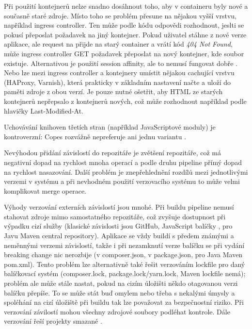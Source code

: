 
        Při použití kontejnerů nelze snadno dosáhnout toho, aby v containeru byly nové a současně staré zdroje. Místo toho se problém přesune na nějakou vyšší vrstvu, například ingress controller. Ten může podle \HTTP kódu odpovědi rozhodnout, jeslti se pokusí přeposlat požadavek na jiný kontejner. Pokud uživatel stáhne \HTML z nové verze aplikace, ale request na  přijde na starý container a vrátí kód \textit{404 Not Found}, může ingress controller GET požadavek přeposlat na nový kontejner, kde soubor existuje. Alternativou je použití session affinity, ale to nemusí fungovat dobře . Nebo lze mezi ingress controller a kontejnery umístit nějakou cachující \HTTP vrstvu (HAProxy, Varnish), která prakticky v základním nastavení načte a uloží do paměti zdroje z obou verzí. Je pouze nutné ošetřit, aby HTML ze starých kontejnerů nepřepsalo \HTML z kontejnerů nových, což může rozhodnout například podle hlavičky Last-Modified-At.


        Uchovávání knihoven třetích stran (například JavaScriptové   moduly) je kontroverzní: Copes rozvážně nepreferuje ani jednu variantu \cite{copes-commit-npm} .

         Nevýhodou přidání závislostí do repozitáře je zvětšení repozitáře, což má negativní dopad na rychlost mnoha operací a podle druhu \CICD pipeline přímý dopad na rychlost nasazování. Další problém je znepřehlednění rozdílů mezi jednotlivými verzemi v systému a při nevhodném použití verzovacího systému to může velmi komplikovat merge operace.

         Výhody verzování externích závislostí jsou mnohé. Při buildu \CICD pipeline nemusí stahovat zdroje mimo samostatného repozitáře, což zvyšuje dostupnost při výpadku cizí služby (klasické závislosti jsou GitHub, JavaScript balíčky , pro Javu Maven central repository). Aplikace se vždy buildí s předem známými a neměnnými verzemi závislostí, takže i při nezamknutí verze balíčku se při vydání breaking change nic nerozbije (v  composer.json, v  package.json, pro Java Maven pom.xml). Tento problém lze alternativně také řešit verzováním lockfile pro daný balíčkovací systém (composer.lock, package.lock/yarn.lock, Maven lockfile nemá); problém ale může stále nastat, pokud na cizím úložišti někdo otagovanou verzi balíčku přepíše. To se může stát buď omylem nebo třeba s nekalými úmysly a spoléhání na cizí úložiště při buildu tak lze považovat za bezpečnostní riziko. Při verzování závilostí mohou všechny zdrojové soubory podléhat kontrole. Dále verzování řeší projekty smazané \cite{williams-left-pad}.

